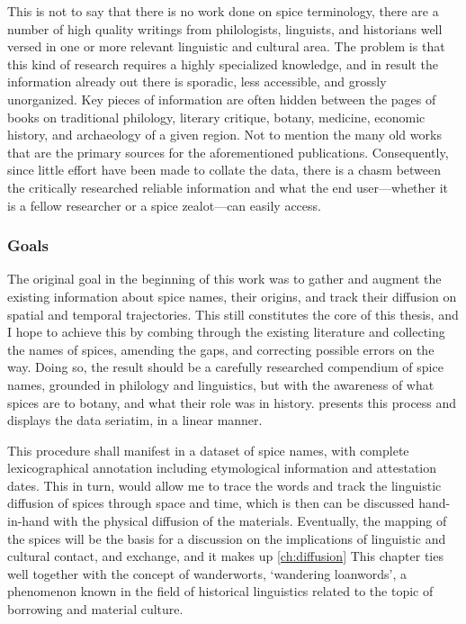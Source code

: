 This is not to say that there is no work done on spice terminology, there are a number of high quality writings from philologists, linguists, and historians well versed in one or more relevant linguistic and cultural area. The problem is that this kind of research requires a highly specialized knowledge, and in result the information already out there is sporadic, less accessible, and grossly unorganized. Key pieces of information are often hidden between the pages of books on traditional philology, literary critique, botany, medicine, economic history, and archaeology of a given region. Not to mention the many old works that are the primary sources for the aforementioned publications. Consequently, since little effort have been made to collate the data, there is a chasm between the critically researched reliable information and what the end user---whether it is a fellow researcher or a spice zealot---can easily access.

\subsubsection{Goals}

The original goal in the beginning of this work was to gather and augment the existing information about spice names, their origins, and track their diffusion on spatial and temporal trajectories. This still constitutes the core of this thesis, and I hope to achieve this by combing through the existing literature and collecting the names of spices, amending the gaps, and correcting possible errors on the way. Doing so, the result should be a carefully researched compendium of spice names, grounded in philology and linguistics, but with the awareness of what spices are to botany, and what their role was in history.  presents this process and displays the data seriatim, in a linear manner. 

This procedure shall manifest in a dataset of spice names, with complete lexicographical annotation including etymological information and attestation dates. This in turn, would allow me to trace the words and track the linguistic diffusion of spices through space and time, which is then can be discussed hand-in-hand with the physical diffusion of the materials. Eventually, the mapping of the spices will be the basis for a discussion on the implications of linguistic and cultural contact, and exchange, and it makes up \cref{ch:diffusion}
This chapter ties well together with the concept of \glspl{wanderwort}, `wandering loanwords', a phenomenon known in the field of historical linguistics related to the topic of borrowing and material culture. 

